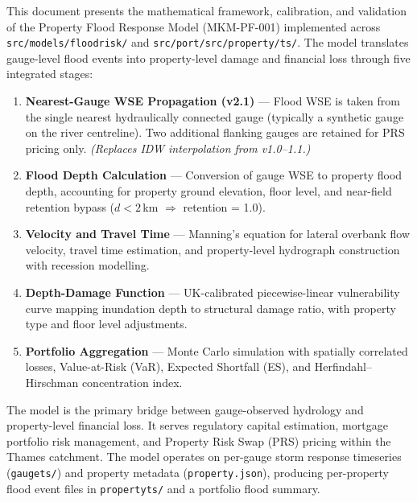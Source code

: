 \documentclass[11pt,a4paper]{article}
\begin{document}
\mkmtitlepage
\mkmlegalpage
\tableofcontents
\clearpage

\mkmexecsummary

This document presents the mathematical framework, calibration, and validation of the
Property Flood Response Model (MKM-PF-001) implemented across
\texttt{src/models/floodrisk/} and \texttt{src/port/src/property/ts/}. The model
translates gauge-level flood events into property-level damage and financial loss
through five integrated stages:

\begin{enumerate}[nosep]
    \item \textbf{Nearest-Gauge WSE Propagation (v2.1)} --- Flood WSE is taken from the
          single nearest hydraulically connected gauge (typically a synthetic gauge on
          the river centreline). Two additional flanking gauges are retained for PRS
          pricing only. \textit{(Replaces IDW interpolation from v1.0--1.1.)}
    \item \textbf{Flood Depth Calculation} --- Conversion of gauge WSE to property flood
          depth, accounting for property ground elevation, floor level, and near-field
          retention bypass ($d < 2$\,km $\Rightarrow$ retention = 1.0).
    \item \textbf{Velocity and Travel Time} --- Manning's equation for lateral overbank
          flow velocity, travel time estimation, and property-level hydrograph
          construction with recession modelling.
    \item \textbf{Depth-Damage Function} --- UK-calibrated piecewise-linear
          vulnerability curve mapping inundation depth to structural damage ratio,
          with property type and floor level adjustments.
    \item \textbf{Portfolio Aggregation} --- Monte Carlo simulation with spatially
          correlated losses, Value-at-Risk (VaR), Expected Shortfall (ES), and
          Herfindahl--Hirschman concentration index.
\end{enumerate}

\noindent The model is the primary bridge between gauge-observed hydrology and
property-level financial loss. It serves regulatory capital estimation, mortgage
portfolio risk management, and Property Risk Swap (PRS) pricing within the Thames
catchment. The model operates on per-gauge storm response timeseries
(\texttt{gaugets/}) and property metadata (\texttt{property.json}), producing
per-property flood event files in \texttt{propertyts/} and a portfolio flood summary.
\end{document}
